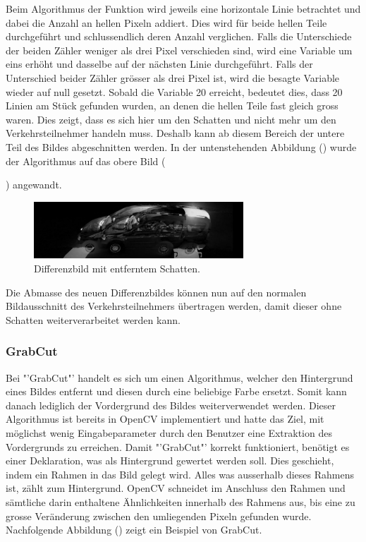Beim Algorithmus der Funktion wird jeweils eine horizontale Linie betrachtet und dabei die Anzahl an hellen Pixeln addiert. Dies wird für beide hellen Teile durchgeführt und schlussendlich deren Anzahl verglichen. Falls die Unterschiede der beiden Zähler weniger als drei Pixel verschieden sind, wird eine Variable um eins erhöht und dasselbe auf der nächsten Linie durchgeführt. Falls der Unterschied beider Zähler grösser als drei Pixel ist, wird die besagte Variable wieder auf null gesetzt. Sobald die Variable 20 erreicht, bedeutet dies, dass 20 Linien am Stück gefunden wurden, an denen die hellen Teile fast gleich gross waren. Dies zeigt, dass es sich hier um den Schatten und nicht mehr um den Verkehrsteilnehmer handeln muss. Deshalb kann ab diesem Bereich der untere Teil des Bildes abgeschnitten werden. In der untenstehenden Abbildung () wurde der Algorithmus auf das obere Bild ({) angewandt.

\begin{figure}[H]
  \centering
  \includegraphics[width=0.7\textwidth]{Testversuche/RemoveShadow.jpg} 
  \caption{Differenzbild mit entferntem Schatten.}
  \label{bRemoveShadow}
\end{figure}

Die Abmasse des neuen Differenzbildes können nun auf den normalen Bildausschnitt des Verkehrsteilnehmers übertragen werden, damit dieser ohne Schatten weiterverarbeitet werden kann.

\subsubsection{GrabCut}
Bei "'GrabCut"' handelt es sich um einen Algorithmus, welcher den Hintergrund eines Bildes entfernt und diesen durch eine beliebige Farbe ersetzt. Somit kann danach lediglich der Vordergrund des Bildes weiterverwendet werden. Dieser Algorithmus ist bereits in OpenCV implementiert und hatte das Ziel, mit möglichst wenig Eingabeparameter durch den Benutzer eine Extraktion des Vordergrunds zu erreichen. Damit "'GrabCut"' korrekt funktioniert, benötigt es einer Deklaration, was als Hintergrund gewertet werden soll. Dies geschieht, indem ein Rahmen in das Bild gelegt wird. Alles was ausserhalb dieses Rahmens ist, zählt zum Hintergrund. OpenCV schneidet im Anschluss den Rahmen und sämtliche darin enthaltene Ähnlichkeiten innerhalb des Rahmens aus, bis eine zu grosse Veränderung zwischen den umliegenden Pixeln gefunden wurde. Nachfolgende Abbildung () zeigt ein Beispiel von GrabCut.

}
